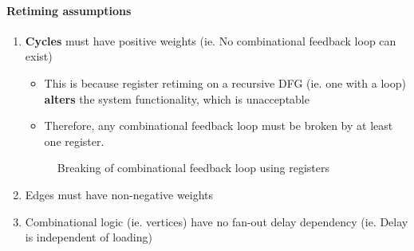 \documentclass{article}
\begin{document}
\paragraph{Retiming assumptions}
\begin{enumerate}
    \item \textbf{Cycles} must have positive weights (ie. No combinational feedback loop can exist)
        \begin{itemize}
            \item This is because register retiming on a recursive DFG (ie. one with a loop) \textbf{alters} the system functionality, which is unacceptable
            \item Therefore, any combinational feedback loop must be broken by at least one register.
        \end{itemize}
        \begin{figure}[htp]%
            \centering
            \qquad
            \caption{Breaking of combinational feedback loop using registers}%
        \end{figure}
    \item Edges must have non-negative weights
    \item Combinational logic (ie. vertices) have no fan-out delay dependency (ie. Delay is independent of loading)
        \begin{figure}[htp]%
            \centering

\end{figure}
\end{enumerate}
\end{document}
